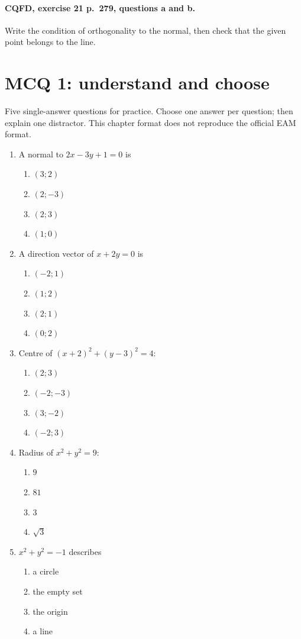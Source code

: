 \paragraph{CQFD, exercise 21 p.~279, questions a and b.}\label{C07-M2} Write the condition of orthogonality to the normal, then check that the given point belongs to the line.
\begingroup\small
\clearpage\section*{MCQ 1: understand and choose}\label{C07-Q1}
Five single-answer questions for practice. Choose one answer per question; then explain one distractor. This chapter format does not reproduce the official EAM format.
\begin{enumerate}
\item A normal to $2x-3y+1=0$ is
\begin{enumerate}[label=\Alph*.,itemsep=2pt]
\item $(3;2)$
\item $(2;-3)$
\item $(2;3)$
\item $(1;0)$
\end{enumerate}
\item A direction vector of $x+2y=0$ is
\begin{enumerate}[label=\Alph*.,itemsep=2pt]
\item $(-2;1)$
\item $(1;2)$
\item $(2;1)$
\item $(0;2)$
\end{enumerate}
\item Centre of $(x+2)^2+(y-3)^2=4$:
\begin{enumerate}[label=\Alph*.,itemsep=2pt]
\item $(2;3)$
\item $(-2;-3)$
\item $(3;-2)$
\item $(-2;3)$
\end{enumerate}
\item Radius of $x^2+y^2=9$:
\begin{enumerate}[label=\Alph*.,itemsep=2pt]
\item $9$
\item $81$
\item $3$
\item $\sqrt3$
\end{enumerate}
\item $x^2+y^2=-1$ describes
\begin{enumerate}[label=\Alph*.,itemsep=2pt]
\item a circle
\item the empty set
\item the origin
\item a line
\end{enumerate}
\end{enumerate}
